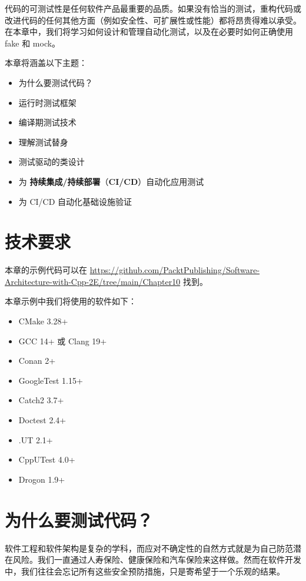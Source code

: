 代码的可测试性是任何软件产品最重要的品质。如果没有恰当的测试，重构代码或改进代码的任何其他方面（例如安全性、可扩展性或性能）都将昂贵得难以承受。在本章中，我们将学习如何设计和管理自动化测试，以及在必要时如何正确使用 fake 和 mock。

本章将涵盖以下主题：

\begin{itemize}
\item 为什么要测试代码？
\item 运行时测试框架
\item 编译期测试技术
\item 理解测试替身
\item 测试驱动的类设计
\item 为 \textbf{持续集成/持续部署}（\textbf{CI/CD}）自动化应用测试
\item 为 CI/CD 自动化基础设施验证
\end{itemize}

\section{技术要求}

本章的示例代码可以在 \href{https://github.com/PacktPublishing/Software-Architecture-with-Cpp-2E/tree/main/Chapter10}{https://github.com/PacktPublishing/Software-Architecture-with-Cpp-2E/tree/main/Chapter10} 找到。

本章示例中我们将使用的软件如下：

\begin{itemize}
\item CMake 3.28+
\item GCC 14+ 或 Clang 19+
\item Conan 2+
\item GoogleTest 1.15+
\item Catch2 3.7+
\item Doctest 2.4+
\item [Boost].UT 2.1+
\item CppUTest 4.0+
\item Drogon 1.9+
\end{itemize}

\section{为什么要测试代码？}

\label{idx:783}
软件工程和软件架构是复杂的学科，而应对不确定性的自然方式就是为自己防范潜在风险。我们一直通过人寿保险、健康保险和汽车保险来这样做。然而在软件开发中，我们往往会忘记所有这些安全预防措施，只是寄希望于一个乐观的结果。

